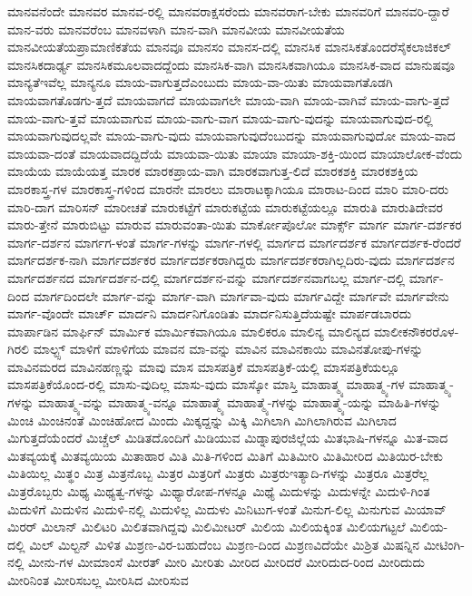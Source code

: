 {ಮಾನವನೆಂದೇ
ಮಾನವರ
ಮಾನವ-ರಲ್ಲಿ
ಮಾನವರಾಕ್ಷಸರೆಂದು
ಮಾನವರಾಗ-ಬೇಕು
ಮಾನವರಿಗೆ
ಮಾನವರಿ-ದ್ದಾರೆ
ಮಾನ-ವರು
ಮಾನವರೆಂಬ
ಮಾನವಳಾಗಿ
ಮಾನ-ವಾಗಿ
ಮಾನವೀಯ
ಮಾನವೀಯತೆಯ
ಮಾನವೀಯತೆಯಪ್ರಾಮಾಣಿಕತೆಯ
ಮಾನವೂ
ಮಾನಸಂ
ಮಾನಸ-ದಲ್ಲಿ
ಮಾನಸಿಕ
ಮಾನಸಿಕತೊಂದರೆಸೈಕಲಾಜಿಕಲ್
ಮಾನಸಿಕದಾರ್ಢ್ಯ
ಮಾನಸಿಕಮೂಲವಾದದ್ದೆಂದು
ಮಾನಸಿಕ-ವಾಗಿ
ಮಾನಸಿಕವಾಗಿಯೂ
ಮಾನಸಿಕ-ವಾದ
ಮಾನುಷವೂ
ಮಾನ್ಯತೆಇವೆಲ್ಲ
ಮಾನ್ಯನೂ
ಮಾಯ-ವಾಗುತ್ತದೆಎಂಬುದು
ಮಾಯ-ವಾ-ಯಿತು
ಮಾಯವಾಗತೊಡಗಿ
ಮಾಯವಾಗತೊಡಗು-ತ್ತದೆ
ಮಾಯವಾಗದೆ
ಮಾಯವಾಗಲೇ
ಮಾಯ-ವಾಗಿ
ಮಾಯ-ವಾಗಿವೆ
ಮಾಯ-ವಾಗು-ತ್ತದೆ
ಮಾಯ-ವಾಗು-ತ್ತವೆ
ಮಾಯವಾಗುವ
ಮಾಯ-ವಾಗು-ವಾಗ
ಮಾಯ-ವಾಗು-ವುದನ್ನು
ಮಾಯವಾಗುವುದ-ರಲ್ಲಿ
ಮಾಯವಾಗುವುದಲ್ಲವೇ
ಮಾಯ-ವಾಗು-ವುದು
ಮಾಯವಾಗುವುದೆಂಬುದನ್ನು
ಮಾಯವಾಗುವುದೋ
ಮಾಯ-ವಾದ
ಮಾಯವಾ-ದಂತೆ
ಮಾಯವಾದದ್ದಿದೆಯೆ
ಮಾಯವಾ-ಯಿತು
ಮಾಯಾ
ಮಾಯಾ-ಶಕ್ತಿ-ಯಿಂದ
ಮಾಯಾಲೋಕ-ವೆಂದು
ಮಾಯೆಯ
ಮಾಯೆಯತ್ತ
ಮಾರಕ
ಮಾರಕಪ್ರಾಯ-ವಾಗಿ
ಮಾರಕವಾಗುತ್ತ-ಲಿದೆ
ಮಾರಕಶಕ್ತಿ
ಮಾರಕಶಕ್ತಿಯ
ಮಾರಕಾಸ್ತ್ರ-ಗಳ
ಮಾರಕಾಸ್ತ್ರ-ಗಳಿಂದ
ಮಾರನೇ
ಮಾರಲು
ಮಾರಾಟಕ್ಕಾಗಿಯೂ
ಮಾರಾಟ-ದಿಂದ
ಮಾರಿ
ಮಾರಿ-ದರು
ಮಾರಿ-ದಾಗ
ಮಾರಿಸನ್
ಮಾರೀಚತೆ
ಮಾರುಕಟ್ಟೆಗೆ
ಮಾರುಕಟ್ಟೆಯ
ಮಾರುಕಟ್ಟೆಯಲ್ಲೂ
ಮಾರುತಿ
ಮಾರುತಿದೇವರ
ಮಾರು-ತ್ತೇನೆ
ಮಾರುಬಿಟ್ಟು
ಮಾರುವ
ಮಾರುವಂತಾ-ಯಿತು
ಮಾರ್ಕೋಪೊಲೋ
ಮಾರ್ಕ್ಸ್
ಮಾರ್ಗ
ಮಾರ್ಗ-ದರ್ಶಕರ
ಮಾರ್ಗ-ದರ್ಶನ
ಮಾರ್ಗಗ-ಳಂತೆ
ಮಾರ್ಗ-ಗಳನ್ನು
ಮಾರ್ಗ-ಗಳಲ್ಲಿ
ಮಾರ್ಗದ
ಮಾರ್ಗದರ್ಶಕ
ಮಾರ್ಗದರ್ಶಕ-ರೆಂದರೆ
ಮಾರ್ಗದರ್ಶಕ-ನಾಗಿ
ಮಾರ್ಗದರ್ಶಕರ
ಮಾರ್ಗದರ್ಶಕರಾಗಿದ್ದರು
ಮಾರ್ಗದರ್ಶಕರಾಗಿಲ್ಲದಿರು-ವುದು
ಮಾರ್ಗದರ್ಶನ
ಮಾರ್ಗದರ್ಶನದ
ಮಾರ್ಗದರ್ಶನ-ದಲ್ಲಿ
ಮಾರ್ಗದರ್ಶನ-ವನ್ನು
ಮಾರ್ಗದರ್ಶನವಾಗಬಲ್ಲ
ಮಾರ್ಗ-ದಲ್ಲಿ
ಮಾರ್ಗ-ದಿಂದ
ಮಾರ್ಗದಿಂದಲೇ
ಮಾರ್ಗ-ವನ್ನು
ಮಾರ್ಗ-ವಾಗಿ
ಮಾರ್ಗವಾ-ವುದು
ಮಾರ್ಗವಿದ್ದೇ
ಮಾರ್ಗವೇ
ಮಾರ್ಗವೇನು
ಮಾರ್ಗ-ವೊಂದೇ
ಮಾರ್ಚ್
ಮಾರ್ದನಿ
ಮಾರ್ದನಿಗೊಂಡಿತು
ಮಾರ್ದನಿಸುತ್ತಿದೆಯಷ್ಟೇ
ಮಾರ್ಪಡಬಾರದು
ಮಾರ್ಪಾಡಿನ
ಮಾರ್ಫಿನ್
ಮಾರ್ಮಿಕ
ಮಾರ್ಮಿಕವಾಗಿಯೂ
ಮಾಲಿಕರೂ
ಮಾಲಿನ್ಯ
ಮಾಲಿನ್ಯದ
ಮಾಲೀಕನೌಕರರೊಳ-ಗಿರಲಿ
ಮಾಲ್ಟ್ಸ್
ಮಾಳಿಗೆ
ಮಾಳಿಗೆಯ
ಮಾವನ
ಮಾ-ವನ್ನು
ಮಾವಿನ
ಮಾವಿನಕಾಯಿ
ಮಾವಿನತೋಪು-ಗಳನ್ನು
ಮಾವಿನಮರದ
ಮಾವಿನಹಣ್ಣನ್ನು
ಮಾವು
ಮಾಸ
ಮಾಸಪತ್ರಿಕೆ
ಮಾಸಪತ್ರಿಕೆ-ಯಲ್ಲಿ
ಮಾಸಪತ್ರಿಕೆಯಲ್ಲೂ
ಮಾಸಪತ್ರಿಕೆಯೊಂದ-ರಲ್ಲಿ
ಮಾಸು-ವುದಿಲ್ಲ
ಮಾಸು-ವುದು
ಮಾಸ್ಕೋ
ಮಾಸ್ತಿ
ಮಾಹಾತ್ಮ್ಯ
ಮಾಹಾತ್ಮ್ಯ-ಗಳ
ಮಾಹಾತ್ಮ್ಯ-ಗಳನ್ನು
ಮಾಹಾತ್ಮ್ಯ-ವನ್ನು
ಮಾಹಾತ್ಮ್ಯ-ವನ್ನೂ
ಮಾಹಾತ್ಮ್ಯೆ
ಮಾಹಾತ್ಮ್ಯೆ-ಗಳನ್ನು
ಮಾಹಾತ್ಮ್ಯೆ-ಯನ್ನು
ಮಾಹಿತಿ-ಗಳನ್ನು
ಮಿಂಚಿ
ಮಿಂಚಿನಂತೆ
ಮಿಂಚಿಹೋದ
ಮಿಂದು
ಮಿಕ್ಕದ್ದನ್ನು
ಮಿಕ್ಕಿ
ಮಿಗಿಲಾಗಿ
ಮಿಗಿಲಾಗಿರುವ
ಮಿಗಿಲಾದ
ಮಿಗುತ್ತದೆಯೆಂದರೆ
ಮಿಚ್ಚೆಲ್
ಮಿಡಿತದೊಂದಿಗೆ
ಮಿಡಿಯುವ
ಮಿಡ್ನಾಪುರಜಿಲ್ಲೆಯ
ಮಿತಭಾಷಿ-ಗಳನ್ನೂ
ಮಿತ-ವಾದ
ಮಿತವ್ಯಯಕ್ಕೆ
ಮಿತವ್ಯಯಿಯ
ಮಿತಾಹಾರ
ಮಿತಿ
ಮಿತಿ-ಗಳಿಂದ
ಮಿತಿಗೆ
ಮಿತಿಮೀರಿ
ಮಿತಿಮೀರಿದ
ಮಿತಿಯಿರ-ಬೇಕು
ಮಿತಿಯಿಲ್ಲ
ಮಿತ್ಥಂ
ಮಿತ್ರ
ಮಿತ್ರನೊಬ್ಬ
ಮಿತ್ರರ
ಮಿತ್ರರಿಗೆ
ಮಿತ್ರರು
ಮಿತ್ರರುಇತ್ಯಾದಿ-ಗಳನ್ನು
ಮಿತ್ರರೂ
ಮಿತ್ರರೆಲ್ಲ
ಮಿತ್ರರೊಬ್ಬರು
ಮಿಥ್ಯ
ಮಿಥ್ಯತ್ವ-ಗಳನ್ನು
ಮಿಥ್ಯಾರೋಪ-ಗಳನ್ನೂ
ಮಿಥ್ಯೆ
ಮಿದುಳನ್ನು
ಮಿದುಳನ್ನೇ
ಮಿದುಳಿ-ಗಿಂತ
ಮಿದುಳಿಗೆ
ಮಿದುಳಿನ
ಮಿದುಳಿ-ನಲ್ಲಿ
ಮಿದುಳಿಲ್ಲ
ಮಿದುಳು
ಮಿನಿಟುಗ-ಳಂತೆ
ಮಿನುಗ-ಲಿಲ್ಲ
ಮಿನುಗುವ
ಮಿಯಾವ್
ಮಿರರ್
ಮಿಲಾನ್
ಮಿಲಿಟರಿ
ಮಿಲಿತವಾಗಿದ್ದವು
ಮಿಲಿಮೀಟರ್
ಮಿಲಿಯ
ಮಿಲಿಯಕ್ಕಿಂತ
ಮಿಲಿಯಗಟ್ಟಲೆ
ಮಿಲಿಯ-ದಲ್ಲಿ
ಮಿಲ್
ಮಿಲ್ಟನ್
ಮಿಳಿತ
ಮಿಶ್ರಣ-ವಿರ-ಬಹುದೆಂಬ
ಮಿಶ್ರಣ-ದಿಂದ
ಮಿಶ್ರಣವಿದೆಯೇ
ಮಿಶ್ರಿತ
ಮಿಷನ್ನಿನ
ಮೀಟಿಂಗಿ-ನಲ್ಲಿ
ಮೀನು-ಗಳ
ಮೀಮಾಂಸೆ
ಮೀರತ್
ಮೀರಿ
ಮೀರಿತು
ಮೀರಿದ
ಮೀರಿದರೆ
ಮೀರಿದುದ-ರಿಂದ
ಮೀರಿದುದು
ಮೀರಿನಿಂತ
ಮೀರಿಸಬಲ್ಲ
ಮೀರಿಸಿದ
ಮೀರಿಸುವ
}
